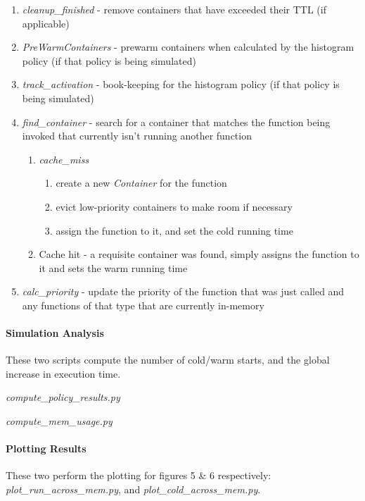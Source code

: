 \begin{enumerate} [label=Step \arabic{enumi}.,ref=Step \arabic{enumi}, leftmargin=*]
  \item {\em cleanup\_finished} - remove containers that have exceeded their TTL (if applicable)
  \item {\em PreWarmContainers} - prewarm containers when calculated by the histogram policy (if that policy is being simulated)
  \item {\em track\_activation} - book-keeping for the histogram policy (if that policy is being simulated)
  \item {\em find\_container} - search for a container that matches the function being invoked that currently isn't running another function
  \begin{enumerate}
    \item {\em cache\_miss}
    \begin{enumerate}
      \item create a new {\em Container} for the function
      \item evict low-priority containers to make room if necessary
      \item assign the function to it, and set the cold running time
    \end{enumerate}
    \item Cache hit - a requisite container was found, simply assigns the function to it and sets the warm running time
  \end{enumerate}
  \item {\em calc\_priority} - update the priority of the function that was just called and any functions of that type that are currently in-memory
\end{enumerate}

\paragraph{Simulation Analysis}

These two scripts compute the number of cold/warm starts, and the global increase in execution time.

{\em compute\_policy\_results.py}

{\em compute\_mem\_usage.py}

\paragraph{Plotting Results}

These two perform the plotting for figures 5 \& 6 respectively: {\em plot\_run\_across\_mem.py}, and {\em plot\_cold\_across\_mem.py}.

